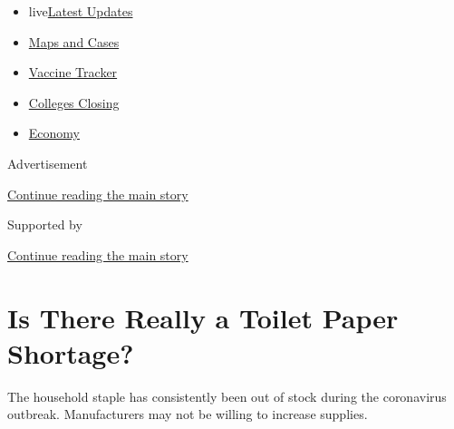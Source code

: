 \begin{itemize}
\tightlist
\item
  live\href{https://www.nytimes3xbfgragh.onion/2020/08/20/world/coronavirus-covid.html?name=styln-coronavirus-markets\&region=TOP_BANNER\&variant=undefined\&block=storyline_menu_recirc\&action=click\&pgtype=Article\&impression_id=4575b941-e385-11ea-bdca-c743cc6a6463}{Latest
  Updates}
\item
  \href{https://www.nytimes3xbfgragh.onion/interactive/2020/us/coronavirus-us-cases.html?name=styln-coronavirus-markets\&region=TOP_BANNER\&variant=undefined\&block=storyline_menu_recirc\&action=click\&pgtype=Article\&impression_id=4575e050-e385-11ea-bdca-c743cc6a6463}{Maps
  and Cases}
\item
  \href{https://www.nytimes3xbfgragh.onion/interactive/2020/science/coronavirus-vaccine-tracker.html?name=styln-coronavirus-markets\&region=TOP_BANNER\&variant=undefined\&block=storyline_menu_recirc\&action=click\&pgtype=Article\&impression_id=4575e051-e385-11ea-bdca-c743cc6a6463}{Vaccine
  Tracker}
\item
  \href{https://www.nytimes3xbfgragh.onion/2020/08/19/us/colleges-closing-covid.html?name=styln-coronavirus-markets\&region=TOP_BANNER\&variant=undefined\&block=storyline_menu_recirc\&action=click\&pgtype=Article\&impression_id=4575e052-e385-11ea-bdca-c743cc6a6463}{Colleges
  Closing}
\item
  \href{https://www.nytimes3xbfgragh.onion/live/2020/08/20/business/stock-market-today-coronavirus?name=styln-coronavirus-markets\&region=TOP_BANNER\&variant=undefined\&block=storyline_menu_recirc\&action=click\&pgtype=Article\&impression_id=4575e053-e385-11ea-bdca-c743cc6a6463}{Economy}
\end{itemize}

Advertisement

\protect\hyperlink{after-top}{Continue reading the main story}

Supported by

\protect\hyperlink{after-sponsor}{Continue reading the main story}

\hypertarget{is-there-really-a-toilet-paper-shortage}{%
\section{Is There Really a Toilet Paper
Shortage?}\label{is-there-really-a-toilet-paper-shortage}}

The household staple has consistently been out of stock during the
coronavirus outbreak. Manufacturers may not be willing to increase
supplies.

